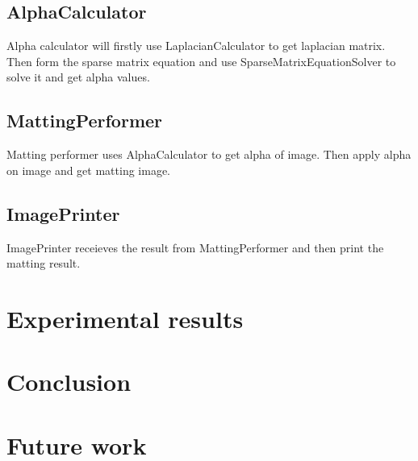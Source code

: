 \documentclass[11pt,letterpaper]{article}
\begin{document}
\subsection{AlphaCalculator}
Alpha calculator will firstly use LaplacianCalculator to get laplacian matrix. Then form the sparse matrix equation and use SparseMatrixEquationSolver to solve it and get alpha values.

\subsection{MattingPerformer}
Matting performer uses AlphaCalculator to get alpha of image. Then apply alpha on image and get matting image.

\subsection{ImagePrinter}
ImagePrinter receieves the result from MattingPerformer and then print the matting result.

\section{Experimental results}
\section{Conclusion}
\section{Future work}


\end{document}

